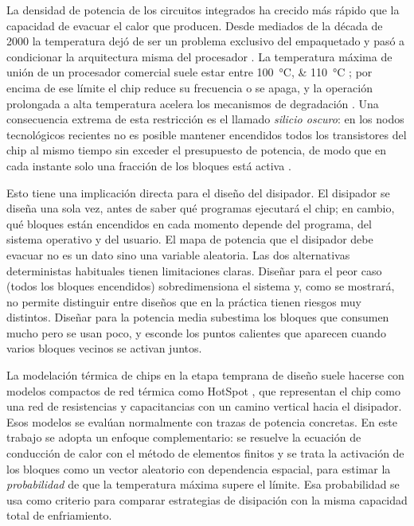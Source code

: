 \documentclass[preprint,11pt,sort&compress]{elsarticle}
\begin{document}
La densidad de potencia de los circuitos integrados ha crecido más rápido que la
capacidad de evacuar el calor que producen. Desde mediados de la década de 2000 la
temperatura dejó de ser un problema exclusivo del empaquetado y pasó a condicionar la
arquitectura misma del procesador \cite{skadron2003temperature,pedram2006thermal}. La
temperatura máxima de unión de un procesador comercial suele estar entre
\SIlist{100;110}{\celsius} \cite{intel_tjmax}; por encima de ese límite el chip reduce su
frecuencia o se apaga, y la operación prolongada a alta temperatura acelera los
mecanismos de degradación \cite{pedram2006thermal}. Una consecuencia extrema de esta
restricción es el llamado \emph{silicio oscuro}: en los nodos tecnológicos recientes no es
posible mantener encendidos todos los transistores del chip al mismo tiempo sin exceder
el presupuesto de potencia, de modo que en cada instante solo una fracción de los bloques
está activa \cite{esmaeilzadeh2011dark}.

Esto tiene una implicación directa para el diseño del disipador. El disipador se diseña
una sola vez, antes de saber qué programas ejecutará el chip; en cambio, qué bloques
están encendidos en cada momento depende del programa, del sistema operativo y del
usuario. El mapa de potencia que el disipador debe evacuar no es un dato sino una
variable aleatoria. Las dos alternativas deterministas habituales tienen limitaciones
claras. Diseñar para el peor caso (todos los bloques encendidos) sobredimensiona el
sistema y, como se mostrará, no permite distinguir entre diseños que en la práctica tienen
riesgos muy distintos. Diseñar para la potencia media subestima los bloques que consumen
mucho pero se usan poco, y esconde los puntos calientes que aparecen cuando varios bloques
vecinos se activan juntos.

La modelación térmica de chips en la etapa temprana de diseño suele hacerse con modelos
compactos de red térmica como HotSpot \cite{huang2006hotspot}, que representan el chip como
una red de resistencias y capacitancias con un camino vertical hacia el disipador. Esos
modelos se evalúan normalmente con trazas de potencia concretas. En este trabajo se adopta
un enfoque complementario: se resuelve la ecuación de conducción de calor con el método de
elementos finitos y se trata la activación de los bloques como un vector aleatorio con
dependencia espacial, para estimar la \emph{probabilidad} de que la temperatura máxima
supere el límite. Esa probabilidad se usa como criterio para comparar estrategias de
disipación con la misma capacidad total de enfriamiento.
\end{document}
